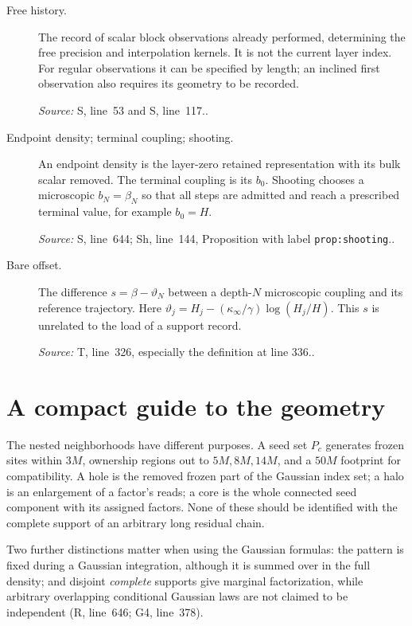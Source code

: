 \documentclass[11pt]{article}
\newcommand{\src}[2]{\textsf{#1}, line~#2}
\newcommand{\where}[1]{\par{\small\textit{Source:} #1.}}
\begin{document}
\begin{description}
\item[Free history.]
The record of scalar block observations already performed, determining
the free precision and interpolation kernels.  It is not the current
layer index.  For regular observations it can be specified by length;
an inclined first observation also requires its geometry to be recorded.
\where{\src{S}{53} and \src{S}{117}.}

\item[Endpoint density; terminal coupling; shooting.]
An endpoint density is the layer-zero retained representation with
its bulk scalar removed.  The terminal coupling is its \(b_0\).
Shooting chooses a microscopic \(b_N=\beta_N\) so that all steps
are admitted and reach a prescribed terminal value, for example
\(b_0=H\).
\where{\src{S}{644}; \src{Sh}{144}, Proposition with label
\texttt{prop:shooting}.}

\item[Bare offset.]
The difference \(s=\beta-\vartheta_N\) between a depth-\(N\)
microscopic coupling and its reference trajectory.  Here
\(\vartheta_j=H_j-(\kappa_\infty/\gamma)\log(H_j/H)\).
This \(s\) is unrelated to the load of a support record.
\where{\src{T}{326}, especially the definition at line 336.}
\end{description}

\section*{A compact guide to the geometry}
The nested neighborhoods have different purposes.  A seed set \(P_c\)
generates frozen sites within \(3M\), ownership regions out to
\(5M,8M,14M\), and a \(50M\) footprint for compatibility.
A hole is the removed frozen part of the Gaussian index set; a halo
is an enlargement of a factor's reads; a core is the whole connected
seed component with its assigned factors.  None of these should be
identified with the complete support of an arbitrary long residual chain.

Two further distinctions matter when using the Gaussian formulas:
the pattern is fixed during a Gaussian integration, although it is
summed over in the full density; and disjoint \emph{complete} supports
give marginal factorization, while arbitrary overlapping conditional
Gaussian laws are not claimed to be independent
(\src{R}{646}; \src{G4}{378}).
\end{document}
